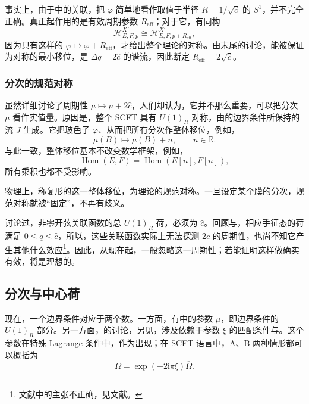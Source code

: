 事实上，由于中的关联，把 $\varphi$ 简单地看作取值于半径 $R=1/\sqrt{\hat c}$ 的 $S^1$，并不完全正确。真正起作用的是有效周期参数 $R_{\mathrm{eff}}$；对于它，有同构
\[
\mathcal{H}^{X'}_{E,F,p}\cong\mathcal{H}^{X'}_{E,F,p+R_{\mathrm{eff}}},
\]
因为只有这样的 $\varphi\mapsto\varphi+R_{\mathrm{eff}}$，才给出整个理论的对称。由末尾的讨论，能被保证为对称的最小移位，是 $\Delta q=2\hat c$ 的谱流，因此断定 $R_{\mathrm{eff}}=2\sqrt{\hat c}$。

\subsubsection{分次的规范对称}\label{sec:5.3.4.2}

虽然详细讨论了周期性 $\mu\mapsto\mu+2\hat c$，人们却认为，它并不那么重要，可以把分次 $\mu$ 看作实值量。原因是，整个 SCFT 具有 $U(1)_R$ 对称，由的边界条件所保持的流 $J$ 生成。它把玻色子 $\varphi$、从而把所有分次作整体移位，例如，
\[
\mu(B)\longmapsto\mu(B)+n,\qquad n\in\mathbb{R}.
\]
与此一致，整体移位基本不改变数学框架，例如，
\begin{equation}\label{eq:5.63}
\operatorname{Hom}(E,F)=\operatorname{Hom}(E[n],F[n]),
\end{equation}
所有乘积也都不受影响。

物理上，称复形的这一整体移位，为理论的规范对称。一旦设定某个膜的分次，规范对称就被“固定”，不再有歧义。

讨论过，非零开弦关联函数的总 $U(1)_R$ 荷，必须为 $\hat c$。回顾与，相应手征态的荷满足 $0\le q\le\hat c$，所以，这些关联函数实际上无法探测 $2\hat c$ 的周期性，也尚不知它产生其他什么效应\footnote{文献中的主张不正确，见文献。}。因此，从现在起，一般忽略这一周期性；若能证明这样做确实有效，将是理想的。

\subsection{分次与中心荷}\label{sec:5.3.5}

现在，一个边界条件对应于两个数。一方面，有中的参数 $\mu$，即边界条件的 $U(1)_R$ 部分。另一方面，的讨论，另见，涉及依赖于参数 $\xi$ 的匹配条件与。这个参数在特殊 Lagrange 条件中，作为出现；在 SCFT 语言中，A、B 两种情形都可以概括为
\begin{equation}\label{eq:5.64}
\Omega=\exp(-2\mathrm{i}\pi\xi)\overline\Omega.
\end{equation}

